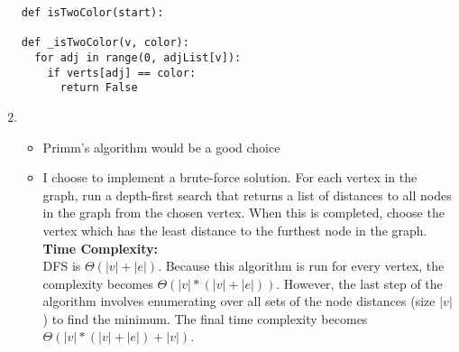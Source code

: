 \documentclass{article}
\begin{document}
\begin{enumerate}
\begin{verbatim}
def isTwoColor(start):

def _isTwoColor(v, color):
  for adj in range(0, adjList[v]):
    if verts[adj] == color:
      return False
  \end{verbatim}
  \item\begin{itemize}
    \item Primm's algorithm would be a good choice
    \item I choose to implement a brute-force solution.  For each vertex in the graph, run a depth-first search that returns a list of distances to all nodes in the graph from the chosen vertex.  When this is completed, choose the vertex which has the least distance to the furthest node in the graph.\\
      \textbf{Time Complexity:}\\
      DFS is $\Theta(|v|+|e|)$.  Because this algorithm is run for every vertex, the complexity becomes $\Theta(|v|*(|v|+|e|))$.  However, the last step of the algorithm involves enumerating over all sets of the node distances (size $|v|$) to find the minimum.  The final time complexity becomes $\Theta(|v|*(|v|+|e|)+|v|)$.
    \end{itemize}

  \end{enumerate}
\end{document}
